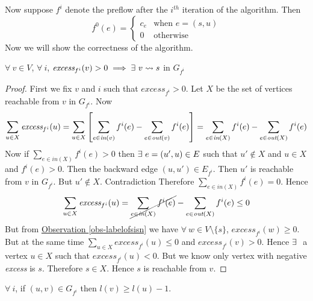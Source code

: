 Now suppose $f^i$ denote the preflow after the $i^{th}$ iteration of the algorithm. Then $$f^0(e)=\begin{cases}
	c_e&\text{when $e=(s,u)$}\\ 0 & \text{otherwise}
\end{cases}$$
Now we will show the correctness of the algorithm.
\begin{lemma}{}{}
	$\forall\ v\in V$, $\forall\ i$, $\textit{excess}_{f^i}(v)>0\implies\exs\ v\rightsquigarrow s$ in $G_{f^i}$
\end{lemma}
\begin{proof}
	First we fix $v$ and $i$ such that $\textit{excess}_{f^i}>0$. Let $X$ be the set of vertices reachable from $v$ in $G_{f^i}$. Now 
	$$
		\sum_{u\in X}\textit{excess}_{f^i}(u) =\sum_{u\in X}\left[ \sum_{e\in \textit{in}(v)}f^i(e)-\sum_{e\in\textit{out}(v)}f^i(e) \right]= \sum_{e\in \textit{in}(X)}f^{i}(e)-\sum_{e\in\textit{out}{(X)}}f^{i}(e)$$
		Now if $\sum\limits_{e\in \textit{in}(X)}f^{i}(e)>0$ then $\exists\ e=(u',u)\in E$ such that $u'\notin X$ and $u\in X$ and $f^{i}(e)>0$. Then the backward edge $(u,u')\in E_{f^i}$. Then $u'$ is reachable from $v$ in $G_{f^i}$. But $u'\notin X$. Contradiction \ctr Therefore $\sum\limits_{e\in \textit{in}(X)}  f^{i}(e)=0$. Hence $$\sum_{u\in X}  \textit{excess}_{f^i}(u)= \cancel{\sum_{e\in \textit{in}(X)}f^{i}(e)}-\sum_{e\in\textit{out}{(X)}}f^{i}(e)\leq 0$$But from \hyperref[obs-labelofsisn]{Observation \ref{obs-labelofsisn}}  we have $\forall\ w\in V\setminus\{s\}$, $\textit{excess}_{f^i}(w)\geq 0$. But at the same time $\sum\limits_{u\in X}  \textit{excess}_{f^i}(u)\leq 0$ and $\textit{excess}_{f^i}(v)>0$. Hence $\exists\ $ a vertex $u\in X$ such that $\textit{excess}_{f^i}(u)< 0$. But we know only vertex with negative \textit{excess} is $s$. Therefore $s\in X$. Hence $s$ is reachable from $v$.
\end{proof}
\begin{lemma}{}{}
	$\forall\ i$, if $(u,v)\in G_{f^i}$ then $l(v)\geq l(u)-1$.	
\end{lemma}
